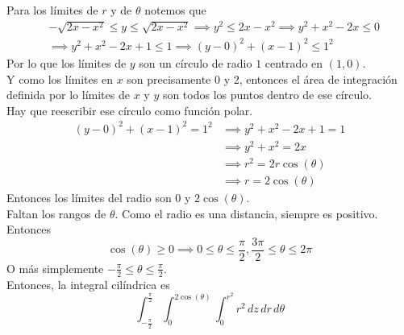 \documentclass{article}
\begin{document}
\begin{enumerate}
{						Para los límites de $r$ y de $\theta$ notemos que
						\begin{align*}
							&-\sqrt{2x-x^2} \leq y \leq \sqrt{2x-x^2}
							\implies y^2 \leq 2x-x^2 \implies y^2 + x^2 - 2x \leq 0\\
							&\implies y^2 + x^2 - 2x + 1 \leq 1
							\implies (y - 0)^2 + (x - 1)^2 \leq 1^2
						\end{align*}
						Por lo que los límites de $y$ son un círculo de radio $1$ centrado
						en $(1, 0)$.\\
						Y como los límites en $x$ son precisamente 0 y 2, entonces el área
						de integración definida por lo límites de $x$ y $y$ son todos los
						puntos dentro de ese círculo.\\
						Hay que reescribir ese círculo como función polar.
						\begin{align*}
							(y-0)^2+(x-1)^2=1^2 &\implies y^2+x^2-2x+1 = 1\\
																	&\implies y^2+x^2 = 2x\\
																	&\implies r^2 = 2r\cos(\theta)\\
																	&\implies r = 2\cos(\theta)
						\end{align*}
						Entonces los límites del radio son 0 y $2\cos(\theta)$.\\
						Faltan los rangos de $\theta$. Como el radio es una distancia,
						siempre es positivo. Entonces
						\[
							\cos(\theta) \geq 0 \implies 0 \leq \theta \leq \frac{\pi}{2},
							\frac{3\pi}{2} \leq \theta \leq 2 \pi
						\]
						O más simplemente $-\frac{\pi}{2} \leq \theta \leq \frac{\pi}{2}$.\\
						Entonces, la integral cilíndrica es
						\[
                \int_{-\frac{\pi}{2}}^{\frac{\pi}{2}}{
                    \int_{0}^{2\cos(\theta)}{
                        \int_{0}^{r^2}{
                            r^2
                        \,dz}
                    \,dr}
                \,d\theta}
            \]

}
\end{enumerate}
\end{document}
